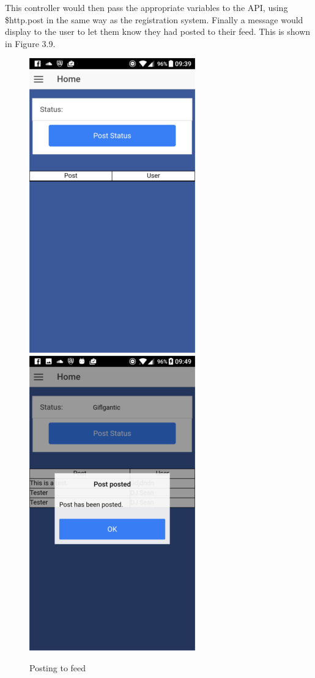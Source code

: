 This controller would then pass the appropriate variables to the API, using \$http.post in the same way as the registration system. Finally a message would display to the user to let them know they had posted to their feed. This is shown in Figure 3.9.
\begin{center}
\begin{figure}[H]
\includegraphics[scale=0.5]{images/sc10}
\includegraphics[scale=0.5]{images/sc11}
\caption{Posting to feed}
\end{figure}
\end{center}

